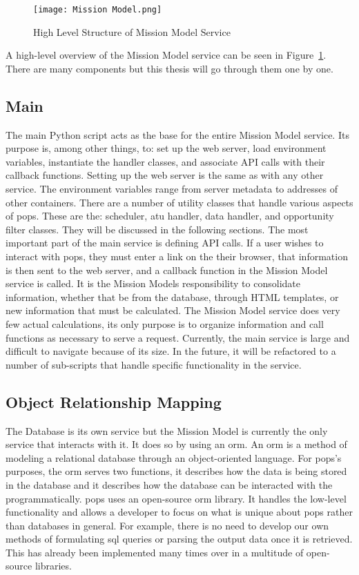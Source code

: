 \begin{figure}[h]
    \centering
    \texttt{[image: Mission Model.png]} 
    \caption{High Level Structure of Mission Model Service}
    \label{fig:mission_model} 
\end{figure}

A high-level overview of the Mission Model service can be seen in
Figure~\ref{fig:mission_model}. There are many components but this thesis will
go through them one by one.

\subsection{Main} 

The main Python script acts as the base for the entire Mission Model service.
Its purpose is, among other things, to: set up the web server, load environment
variables, instantiate the handler classes, and associate API calls with their
callback functions. Setting up the web server is the same as with any other
service. The environment variables range from server metadata to addresses of
other containers. There are a number of utility classes that handle various
aspects of \gls{pops}. These are the: scheduler, \gls{atu} handler, data
handler, and opportunity filter classes. They will be discussed in the
following sections.  The most important part of the main service is defining
API calls. If a user wishes to interact with \gls{pops}, they must enter a link
on the their browser, that information is then sent to the web server, and a
callback function in the Mission Model service is called. It is the Mission
Models responsibility to consolidate information, whether that be from the
database, through HTML templates, or new information that must be calculated.
The Mission Model service does very few actual calculations, its only purpose
is to organize information and call functions as necessary to serve a request.
Currently, the main service is large and difficult to navigate because of its
size. In the future, it will be refactored to a number of sub-scripts that
handle specific functionality in the service.

\subsection{Object Relationship Mapping}\label{sec:orm}

The Database is its own service but the Mission Model is currently the only
service that interacts with it. It does so by using an \gls{orm}. An \gls{orm}
is a method of modeling a relational database through an object-oriented
language. For \gls{pops}'s purposes, the \gls{orm} serves two functions, it
describes how the data is being stored in the database and it describes how the
database can be interacted with the programmatically. \gls{pops} uses an
open-source \gls{orm} library. It handles the low-level functionality and
allows a developer to focus on what is unique about \gls{pops} rather than
databases in general. For example, there is no need to develop our own methods
of formulating \gls{sql} queries or parsing the output data once it is
retrieved. This has already been implemented many times over in a multitude of
open-source libraries. 


